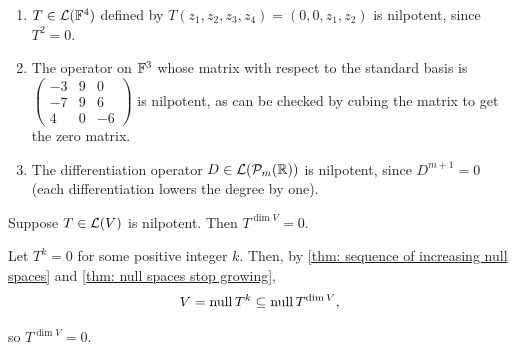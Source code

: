 \begin{example}
  \begin{enumerate}[label=\textbf{(\alph*)}]
    \item $T \in \mathcal{L}(\mathbb{F}^4)$ defined by $T(z_1, z_2, z_3, z_4) = (0, 0, z_1, z_2)$ is nilpotent, since $T^2 = 0$.
    \item The operator on $\mathbb{F}^3$ whose matrix with respect to the standard basis is
    $\left(\begin{smallmatrix} -3 & 9 & 0 \\ -7 & 9 & 6 \\ 4 & 0 & -6 \end{smallmatrix}\right)$
    is nilpotent, as can be checked by cubing the matrix to get the zero matrix.
    \item The differentiation operator $D \in \mathcal{L}(\mathcal{P}_m(\mathbb{R}))$ is nilpotent, since $D^{m+1} = 0$ (each differentiation lowers the degree by one).
  \end{enumerate}
\end{example}

\begin{thm}
  \label{thm: nilpotent operator raised to dimension of domain is 0}
  Suppose $T \in \mathcal{L}(V)$ is nilpotent. Then $T^{\dim V} = 0$.
\end{thm}
\begin{prf}
  Let $T^k = 0$ for some positive integer $k$. Then, by \ref{thm: sequence of increasing null spaces} and \ref{thm: null spaces stop growing},
  \begin{equation}
    V = \operatorname{null} T^k \subseteq \operatorname{null} T^{\dim V},
  \end{equation}

  so $T^{\dim V} = 0$.
\end{prf}

